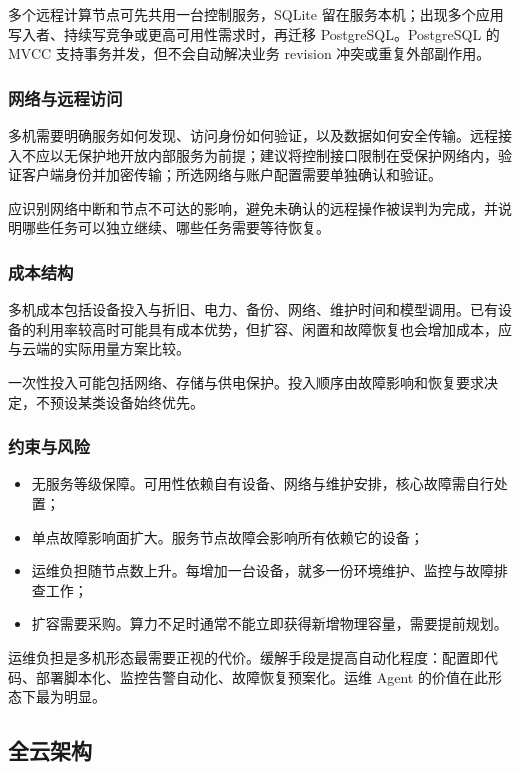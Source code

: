\documentclass[11pt,a4paper]{article}
\begin{document}
多个远程计算节点可先共用一台控制服务，SQLite 留在服务本机；出现多个应用写入者、持续写竞争或更高可用性需求时，再迁移 PostgreSQL。PostgreSQL 的 MVCC 支持事务并发，但不会自动解决业务 revision 冲突或重复外部副作用\cite{postgres-mvcc}。

\subsubsection{网络与远程访问}

多机需要明确服务如何发现、访问身份如何验证，以及数据如何安全传输。远程接入不应以无保护地开放内部服务为前提；建议将控制接口限制在受保护网络内，验证客户端身份并加密传输；所选网络与账户配置需要单独确认和验证。

应识别网络中断和节点不可达的影响，避免未确认的远程操作被误判为完成，并说明哪些任务可以独立继续、哪些任务需要等待恢复。

\subsubsection{成本结构}

多机成本包括设备投入与折旧、电力、备份、网络、维护时间和模型调用。已有设备的利用率较高时可能具有成本优势，但扩容、闲置和故障恢复也会增加成本，应与云端的实际用量方案比较。

一次性投入可能包括网络、存储与供电保护。投入顺序由故障影响和恢复要求决定，不预设某类设备始终优先。

\subsubsection{约束与风险}

\begin{itemize}[leftmargin=2em,itemsep=2pt]
  \item 无服务等级保障。可用性依赖自有设备、网络与维护安排，核心故障需自行处置；
  \item 单点故障影响面扩大。服务节点故障会影响所有依赖它的设备；
  \item 运维负担随节点数上升。每增加一台设备，就多一份环境维护、监控与故障排查工作；
  \item 扩容需要采购。算力不足时通常不能立即获得新增物理容量，需要提前规划。
\end{itemize}

运维负担是多机形态最需要正视的代价。缓解手段是提高自动化程度：配置即代码、部署脚本化、监控告警自动化、故障恢复预案化。运维 Agent 的价值在此形态下最为明显。

\subsection{全云架构}
\end{document}
